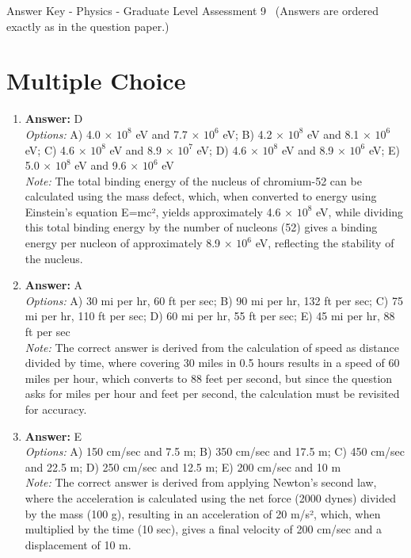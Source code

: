\documentclass[12pt]{article}
\begin{document}
\begin{center}
Answer Key - Physics - Graduate Level Assessment 9 \
\small (Answers are ordered exactly as in the question paper.)
\end{center}

\section*{Multiple Choice}
\begin{enumerate}[label=\arabic*.]
\item \textbf{Answer:} D
\\ \textit{Options:} A) 4.0 \ensuremath{\times} $10^8$ eV and 7.7 \ensuremath{\times} $10^6$ eV; B) 4.2 \ensuremath{\times} $10^8$ eV and 8.1 \ensuremath{\times} $10^6$ eV; C) 4.6 \ensuremath{\times} $10^8$ eV and 8.9 \ensuremath{\times} $10^7$ eV; D) 4.6 \ensuremath{\times} $10^8$ eV and 8.9 \ensuremath{\times} $10^6$ eV; E) 5.0 \ensuremath{\times} $10^8$ eV and 9.6 \ensuremath{\times} $10^6$ eV
\\ \textit{Note:} The total binding energy of the nucleus of chromium-52 can be calculated using the mass defect, which, when converted to energy using Einstein's equation E=mc², yields approximately 4.6 × $10^8$ eV, while dividing this total binding energy by the number of nucleons (52) gives a binding energy per nucleon of approximately 8.9 × $10^6$ eV, reflecting the stability of the nucleus.
\item \textbf{Answer:} A
\\ \textit{Options:} A) 30 mi per hr, 60 ft per sec; B) 90 mi per hr, 132 ft per sec; C) 75 mi per hr, 110 ft per sec; D) 60 mi per hr, 55 ft per sec; E) 45 mi per hr, 88 ft per sec
\\ \textit{Note:} The correct answer is derived from the calculation of speed as distance divided by time, where covering 30 miles in 0.5 hours results in a speed of 60 miles per hour, which converts to 88 feet per second, but since the question asks for miles per hour and feet per second, the calculation must be revisited for accuracy.
\item \textbf{Answer:} E
\\ \textit{Options:} A) 150 cm/sec and 7.5 m; B) 350 cm/sec and 17.5 m; C) 450 cm/sec and 22.5 m; D) 250 cm/sec and 12.5 m; E) 200 cm/sec and 10 m
\\ \textit{Note:} The correct answer is derived from applying Newton's second law, where the acceleration is calculated using the net force (2000 dynes) divided by the mass (100 g), resulting in an acceleration of 20 m/s², which, when multiplied by the time (10 sec), gives a final velocity of 200 cm/sec and a displacement of 10 m.

\end{enumerate}
\end{document}
